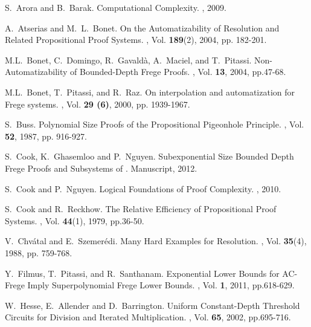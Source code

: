 \documentclass{LMCS}
\begin{document}
\begin{thebibliography}{10}


S.~Arora and B.~Barak.
\newblock Computational Complexity.
, 2009.

A.~Atserias and M.~L.~Bonet.
\newblock On the Automatizability of Resolution and Related Propositional Proof
Systems.
, Vol. {\bf 189}(2), 2004, pp. 182-201.



M.L.~Bonet, C.~Domingo, R.~Gavald\`a, A.~Maciel, and T.~Pitassi.
\newblock Non-Automatizability of Bounded-Depth Frege Proofs.
, Vol. {\bf 13}, 2004, pp.47-68.

M.L.~Bonet, T.~Pitassi, and R.~Raz.
\newblock On interpolation and automatization for Frege systems.
,  Vol. {\bf 29 (6)}, 2000, pp. 1939-1967.


S.~Buss.
\newblock Polynomial Size Proofs of the Propositional Pigeonhole Principle.
, Vol. {\bf 52}, 1987, pp. 916-927.

S.~Cook, K.~Ghasemloo and P.~Nguyen.
\newblock Subexponential Size Bounded Depth Frege Proofs and Subsystems of .
\newblock Manuscript, 2012.

S.~Cook and P.~Nguyen.
\newblock Logical Foundations of Proof Complexity.
, 2010.


S.~Cook and R.~Reckhow.
\newblock The Relative Efficiency of Propositional Proof Systems.
, Vol. {\bf 44}(1), 1979, pp.36-50.

V.~Chv{\'a}tal and E.~Szemer{\'e}di.
\newblock Many Hard Examples for Resolution.
, Vol. {\bf 35}(4), 1988, pp. 759-768.

Y.~Filmus, T.~Pitassi,  and R.~Santhanam.
\newblock Exponential Lower Bounds for AC-Frege Imply Superpolynomial Frege Lower
Bounds.
, Vol. {\bf 1}, 2011, pp.618-629.

W.~Hesse, E.~Allender and D.~Barrington.
\newblock Uniform Constant-Depth Threshold Circuits for Division and
Iterated Multiplication.
, Vol. {\bf 65}, 2002,
pp.695-716.


\end{thebibliography}
\end{document}
